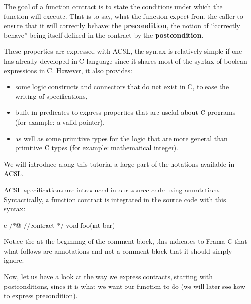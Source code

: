 The goal of a function contract is to state the conditions under which
the function will execute. That is to say, what the function expect from
the caller to ensure that it will correctly behave: the \textbf{precondition},
the notion of ``correctly behave'' being itself defined in the contract
by the \textbf{postcondition}.



These properties are expressed with ACSL, the syntax is relatively
simple if one has already developed in C language since it shares most
of the syntax of boolean expressions in C. However, it also provides:



\begin{itemize}
\item
  some logic constructs and connectors that do not exist in C, to ease
  the writing of specifications,
\item
  built-in predicates to express properties that are useful about C
  programs (for example: a valid pointer),
\item
  as well as some primitive types for the logic that are more general
  than primitive C types (for example: mathematical integer).
\end{itemize}



We will introduce along this tutorial a large part of the notations
available in ACSL.



ACSL specifications are introduced in our source code using annotations.
Syntactically, a function contract is integrated in the source code with
this syntax:



\begin{CodeBlock}{c}
/*@
  //contract
*/
void foo(int bar){

}
\end{CodeBlock}



Notice the  at the beginning of the comment block, this
indicates to Frama-C that what follows are annotations and not a comment
block that it should simply ignore.



Now, let us have a look at the way we express contracts, starting with
postconditions, since it is what we want our function to do (we will
later see how to express precondition).





